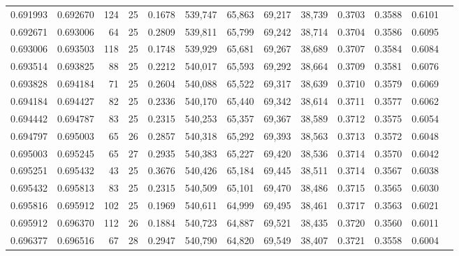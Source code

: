 \begin{tabular}{rrrrrrrrrrrrr}
0.691993 & 0.692670 &   124 &  25 &                                     0.1678 & 539,747 &  65,863 &  69,217 &  38,739 & 0.3703 & 0.3588 & 0.6101 \\
0.692671 & 0.693006 &    64 &  25 &                                     0.2809 & 539,811 &  65,799 &  69,242 &  38,714 & 0.3704 & 0.3586 & 0.6095 \\
0.693006 & 0.693503 &   118 &  25 &                                     0.1748 & 539,929 &  65,681 &  69,267 &  38,689 & 0.3707 & 0.3584 & 0.6084 \\
0.693514 & 0.693825 &    88 &  25 &                                     0.2212 & 540,017 &  65,593 &  69,292 &  38,664 & 0.3709 & 0.3581 & 0.6076 \\
0.693828 & 0.694184 &    71 &  25 &                                     0.2604 & 540,088 &  65,522 &  69,317 &  38,639 & 0.3710 & 0.3579 & 0.6069 \\
0.694184 & 0.694427 &    82 &  25 &                                     0.2336 & 540,170 &  65,440 &  69,342 &  38,614 & 0.3711 & 0.3577 & 0.6062 \\
0.694442 & 0.694787 &    83 &  25 &                                     0.2315 & 540,253 &  65,357 &  69,367 &  38,589 & 0.3712 & 0.3575 & 0.6054 \\
0.694797 & 0.695003 &    65 &  26 &                                     0.2857 & 540,318 &  65,292 &  69,393 &  38,563 & 0.3713 & 0.3572 & 0.6048 \\
0.695003 & 0.695245 &    65 &  27 &                                     0.2935 & 540,383 &  65,227 &  69,420 &  38,536 & 0.3714 & 0.3570 & 0.6042 \\
0.695251 & 0.695432 &    43 &  25 &                                     0.3676 & 540,426 &  65,184 &  69,445 &  38,511 & 0.3714 & 0.3567 & 0.6038 \\
0.695432 & 0.695813 &    83 &  25 &                                     0.2315 & 540,509 &  65,101 &  69,470 &  38,486 & 0.3715 & 0.3565 & 0.6030 \\
0.695816 & 0.695912 &   102 &  25 &                                     0.1969 & 540,611 &  64,999 &  69,495 &  38,461 & 0.3717 & 0.3563 & 0.6021 \\
0.695912 & 0.696370 &   112 &  26 &                                     0.1884 & 540,723 &  64,887 &  69,521 &  38,435 & 0.3720 & 0.3560 & 0.6011 \\
0.696377 & 0.696516 &    67 &  28 &                                     0.2947 & 540,790 &  64,820 &  69,549 &  38,407 & 0.3721 & 0.3558 & 0.6004 \\

\end{tabular}

